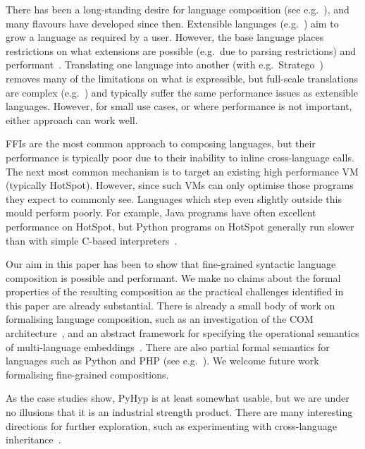 \documentclass[a4paper,UKenglish]{lipics-v2016}
\newcommand{\ourvm}{PyHyp\xspace}
\begin{document}
There has been a long-standing desire for language composition (see
e.g.~\cite{cheatham69motivation}), and many flavours have developed since then.
Extensible languages
(e.g.~\cite{irons70experience,gregory85ametalanguage,cardelli93extensible}) aim
to grow a language as required by a user. However, the base language
places restrictions on what extensions are possible (e.g.~due to parsing
restrictions) and performant~\cite{tratt08domainspecific}. Translating one
language into another (with e.g.~Stratego~\cite{bravenboer08stratego}) removes
many of the limitations on what is expressible, but  full-scale translations are
complex (e.g.~\cite{gray05finegrained}) and typically suffer the same
performance issues as extensible languages. However, for small use cases, or
where performance is not important, either approach can work well.

FFIs are the most common approach to composing languages, but their performance
is typically poor due to their inability to inline cross-language calls. The
next most common mechanism is to target an existing high performance VM
(typically HotSpot). However, since such VMs can only optimise those programs
they expect to commonly see. Languages which step even slightly outside this
mould perform poorly. For example, Java programs have often excellent
performance on HotSpot, but Python programs on HotSpot generally run slower than
with simple C-based interpreters~\cite{sarimbekov13characteriustics,bolz14impact}.

Our aim in this paper has been to show that fine-grained syntactic language
composition is possible and performant. We make no claims about the formal
properties of the resulting composition as the practical challenges identified
in this paper are already substantial. There is already a small body of work on
formalising language composition, such as an investigation of the COM
architecture~\cite{sullivan99analysis}, and an abstract framework for
specifying the operational semantics of multi-language
embeddings~\cite{matthews09operational}. There are also partial formal semantics
for languages such as Python
and PHP (see e.g.~\cite{politz13monty,filaretti14phpsemantics}). We welcome
future work formalising fine-grained compositions.

As the case studies show, \ourvm is at least somewhat usable, but we are under
no illusions that it is an industrial strength product. There are many interesting
directions for further exploration, such as experimenting with cross-language
inheritance~\cite{gray08safe}.
\end{document}
